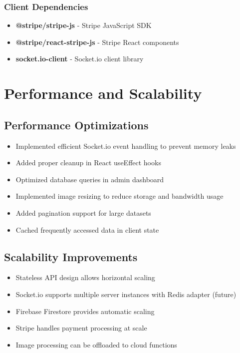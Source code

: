 \documentclass[11pt]{article}
\begin{document}
\subsubsection{Client Dependencies}
\begin{itemize}[leftmargin=1.4em]
  \item \textbf{@stripe/stripe-js} - Stripe JavaScript SDK
  \item \textbf{@stripe/react-stripe-js} - Stripe React components
  \item \textbf{socket.io-client} - Socket.io client library
\end{itemize}

\section{Performance and Scalability}

\subsection{Performance Optimizations}
\begin{itemize}[leftmargin=1.4em]
  \item Implemented efficient Socket.io event handling to prevent memory leaks
  \item Added proper cleanup in React useEffect hooks
  \item Optimized database queries in admin dashboard
  \item Implemented image resizing to reduce storage and bandwidth usage
  \item Added pagination support for large datasets
  \item Cached frequently accessed data in client state
\end{itemize}

\subsection{Scalability Improvements}
\begin{itemize}[leftmargin=1.4em]
  \item Stateless API design allows horizontal scaling
  \item Socket.io supports multiple server instances with Redis adapter (future)
  \item Firebase Firestore provides automatic scaling
  \item Stripe handles payment processing at scale
  \item Image processing can be offloaded to cloud functions
\end{itemize}
\end{document}
